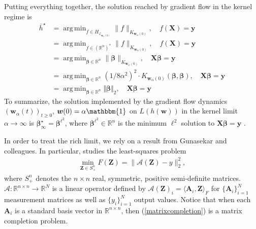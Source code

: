 \documentclass{article}
\DeclareMathOperator*{\argmin}{arg\,min}
\begin{document}
Putting everything together, the solution reached by gradient flow in the kernel regime is
\begin{align*}
    \bar{h}^{\star} &= \argmin_{f \in H_{\varphi_{\boldsymbol{w}_{\alpha}(0)}}} \| f \|_{K_{\boldsymbol{w}_{\alpha}(0)}},\quad f(\boldsymbol{X}) = \boldsymbol{y}\\
    &= \argmin_{f \in (\mathbb{R}^n)^*} \| f \|_{K_{\boldsymbol{w}_{\alpha}(0)}},\quad f(\boldsymbol{X}) = \boldsymbol{y}\\
    &= \argmin_{\boldsymbol{\beta} \in \mathbb{R}^n} \| \boldsymbol{\beta} \|_{K_{\boldsymbol{w}_{\alpha}(0)} },\quad \boldsymbol{X}\boldsymbol{\beta} = \boldsymbol{y}\\
    &= \argmin_{\boldsymbol{\beta} \in \mathbb{R}^n} (1/8\alpha^2)^2\cdot K_{\boldsymbol{w}_{\alpha}(0)}(\boldsymbol{\beta},\boldsymbol{\beta}), \quad \boldsymbol{X}\boldsymbol{\beta} = \boldsymbol{y}\\
    &= \argmin_{\boldsymbol{\beta} \in \mathbb{R}^n} \Vert \boldsymbol{\beta} \Vert_2, \quad \boldsymbol{X}\boldsymbol{\beta} = \boldsymbol{y}
\end{align*}
To summarize, the solution implemented by the gradient flow dynamics $(\boldsymbol{w}_{\alpha}(t))_{t \geq 0}$, $\boldsymbol{w}(0) = \alpha \mathbbm{1}$ on $L(h(\boldsymbol{w}))$ in the kernel limit $\alpha \rightarrow \infty$ is $\boldsymbol{\beta}_{\infty}^{\star} = \boldsymbol{\beta}^{\ell^2}$, where $\boldsymbol{\beta}^{\ell^2} \in \mathbb{R}^n$ is the minimum $\ell^2$ solution to $\boldsymbol{X} \boldsymbol{\beta} = \boldsymbol{y}$ \cite{woodworth2020kernel}.

In order to treat the rich limit, we rely on a result from Gunasekar and colleagues. In particular, \cite{gunasekar2018implicit} studies the least-squares problem
\begin{align}\label{matrixcompletion}
    \min_{\boldsymbol{Z} \in S_+^n} F(\boldsymbol{Z}) = \| \mathcal{A}(\boldsymbol{Z}) - y \|_2^2,
\end{align}
where $S_+^n$ denotes the $n \times n$ real, symmetric, positive semi-definite matrices. $\mathcal{A}: \mathbb{R}^{n \times n} \rightarrow \mathbb{R}^N$ is a linear operator defined by $\mathcal{A}(\boldsymbol{Z})_i = \langle \boldsymbol{A}_i, \boldsymbol{Z} \rangle_F$ for $\{ \boldsymbol{A}_i \}_{i=1}^N$ measurement matrices as well as $\{ y_i \}_{i=1}^N$ output values. Notice that when each $\boldsymbol{A}_i$ is a standard basis vector in $\mathbb{R}^{n \times n}$, then (\ref{matrixcompletion}) is a matrix completion problem.
\end{document}
